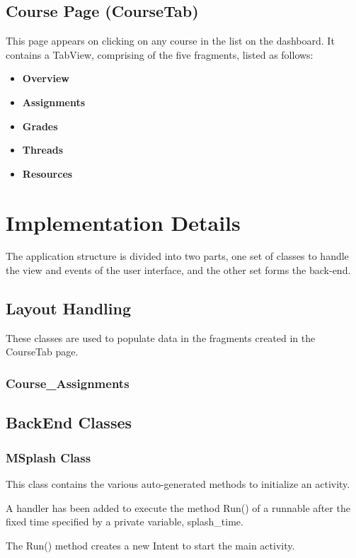 \documentclass{article}
\begin{document}
\subsection{Course Page (CourseTab)}
\par\noindent This page appears on clicking on any course in the list on the dashboard. It contains a TabView, comprising of the five fragments, listed as follows:
\begin{itemize}
\item \textbf{Overview}
\item \textbf{Assignments}
\item \textbf{Grades}
\item \textbf{Threads}
\item \textbf{Resources}
\end{itemize}

\section{Implementation Details}
\par\noindent The application structure is divided into two parts, one set of classes to handle the view and events of the user interface, and the other set forms the back-end.
\subsection{Layout Handling}
\par\noindent These classes are used to populate data in the fragments created in the CourseTab page.
\subsubsection{Course\_Assignments}

\subsection{BackEnd Classes}
\subsubsection{MSplash Class}
\par\noindent This class contains the various auto-generated methods to initialize an activity.
\par\noindent A handler has been added to execute the method Run() of a runnable after the fixed time specified by a private variable, splash\_time.
\par\noindent The Run() method creates a new Intent to start the main activity.
\end{document}
